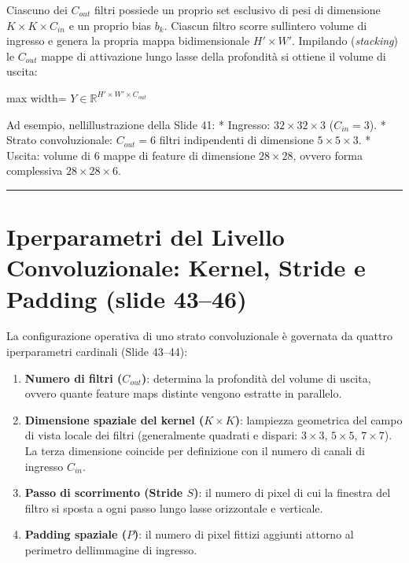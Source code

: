 \documentclass[11pt,a4paper,oneside,openany]{book}
\providecommand{\tightlist}{\setlength{\itemsep}{0pt}\setlength{\parskip}{0pt}}
\begin{document}
Ciascuno dei \(C_{out}\) filtri possiede un proprio set esclusivo di pesi di dimensione \(K \times K \times C_{in}\) e un proprio bias \(b_k\). Ciascun filtro scorre sull\textquotesingle intero volume di ingresso e genera la propria mappa bidimensionale \(H' \times W'\). Impilando (\emph{stacking}) le \(C_{out}\) mappe di attivazione lungo l\textquotesingle asse della profondità si ottiene il volume di uscita:

\begin{center}
\begin{adjustbox}{max width=\linewidth}
$\displaystyle 
\boxed{Y \in \mathbb{R}^{H' \times W' \times C_{out}}}
$
\end{adjustbox}
\end{center}

Ad esempio, nell\textquotesingle illustrazione della Slide 41: * Ingresso: \(32 \times 32 \times 3\) (\(C_{in} = 3\)). * Strato convoluzionale: \(C_{out} = 6\) filtri indipendenti di dimensione \(5 \times 5 \times 3\). * Uscita: volume di 6 mappe di feature di dimensione \(28 \times 28\), ovvero forma complessiva \(28 \times 28 \times 6\).

\begin{center}\rule{0.5\linewidth}{0.5pt}\end{center}

\section{Iperparametri del Livello Convoluzionale: Kernel, Stride e Padding (slide 43--46)}\label{f02-r541}

La configurazione operativa di uno strato convoluzionale è governata da quattro iperparametri cardinali (Slide 43--44):

\begin{enumerate}
\def\labelenumi{\arabic{enumi}.}
\tightlist
\item
  \textbf{Numero di filtri (\(C_{out}\))}: determina la profondità del volume di uscita, ovvero quante feature maps distinte vengono estratte in parallelo.
\item
  \textbf{Dimensione spaziale del kernel (\(K \times K\))}: l\textquotesingle ampiezza geometrica del campo di vista locale dei filtri (generalmente quadrati e dispari: \(3 \times 3\), \(5 \times 5\), \(7 \times 7\)). La terza dimensione coincide per definizione con il numero di canali di ingresso \(C_{in}\).
\item
  \textbf{Passo di scorrimento (Stride \(S\))}: il numero di pixel di cui la finestra del filtro si sposta a ogni passo lungo l\textquotesingle asse orizzontale e verticale.
\item
  \textbf{Padding spaziale (\(P\))}: il numero di pixel fittizi aggiunti attorno al perimetro dell\textquotesingle immagine di ingresso.
\end{enumerate}
\end{document}
